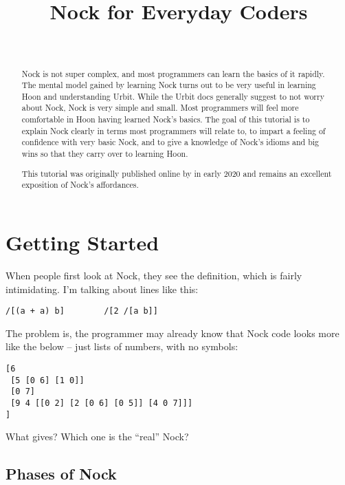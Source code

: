 \documentclass[twoside]{article}
\title{Nock for Everyday Coders}
\author{\authorname~\authorpatp \\ \affiliation}
\date{}
\begin{document}
\maketitle
\thispagestyle{firststyle}

\begin{abstract}
  \sloppy
  Nock is not super complex, and most programmers can learn the basics of it rapidly. The mental model gained by learning Nock turns out to be very useful in learning Hoon and understanding \mbox{Urbit}.  While the Urbit docs generally suggest to not worry about Nock, Nock is very simple and small.  Most programmers will feel more comfortable in Hoon having learned Nock's basics.  The goal of this tutorial is to explain Nock clearly in terms most programmers will relate to, to impart a feeling of confidence with very basic Nock, and to give a knowledge of Nock’s idioms and big wins so that they carry over to learning Hoon.

  \sloppy
  This tutorial was originally published online by  in early 2020 and remains an excellent exposition of Nock's affordances.
\end{abstract}

\setcounter{page}{1}

\tableofcontents

\section{Getting Started}

When people first look at Nock, they see the definition, which is fairly intimidating.  I'm talking about lines like this:

\begin{lstlisting}[style=listingblock]
/[(a + a) b]        /[2 /[a b]]
\end{lstlisting}

The problem is, the programmer may already know that Nock code looks more like the below – just lists of numbers, with no symbols:

\begin{lstlisting}[style=listingblock]
[6
 [5 [0 6] [1 0]]
 [0 7]
 [9 4 [[0 2] [2 [0 6] [0 5]] [4 0 7]]]
]
\end{lstlisting}

What gives? Which one is the ``real'' Nock?

\subsection{Phases of Nock}
\end{document}
